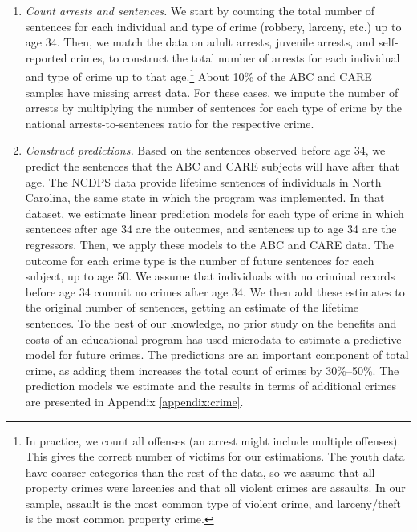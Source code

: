 \begin{enumerate}
\item \textit{Count arrests and sentences.} We start by counting the total number of sentences for each individual
and type of crime (robbery, larceny, etc.) up to age 34. Then, we match the data on adult arrests, juvenile arrests, and self-reported crimes, to construct the total number of  arrests for each individual and type of crime up to that age.\footnote{In practice, we count all offenses (an arrest might include multiple offenses). This gives the correct number of victims for our estimations. The youth data have coarser categories than the rest of the data, so we assume that all property crimes were larcenies and that all violent crimes are assaults. In our sample, assault is the most common type of violent crime, and larceny/theft is the most common property crime.} About 10\% of the ABC and CARE samples have missing arrest data. For these cases, we impute the number of arrests by multiplying the number of sentences for each type of crime by the  national arrests-to-sentences ratio for the respective crime.

\item \textit{Construct predictions.} Based on the sentences observed before age 34, we predict the sentences
that the ABC and CARE subjects will have after that age. The NCDPS data provide lifetime sentences of individuals in North Carolina, the same state in which the program was implemented. In that dataset, we estimate linear prediction models for each type of crime in which sentences after age 34 are the outcomes, and sentences up to age 34 are the regressors. Then, we apply these models to the ABC and CARE data. The outcome for each crime type is the number of future sentences for each subject, up to age 50. We assume that individuals with no criminal records before age 34 commit no crimes after age 34. We then add these estimates to the original number of sentences, getting an estimate of the lifetime sentences. To the best of our knowledge, no prior study on the benefits and costs of an educational program has used microdata to estimate a predictive model for future crimes. The predictions are an important component of total crime, as adding them increases the total count of crimes by 30\%--50\%. The prediction models we estimate and the results in terms of additional crimes are presented in Appendix \ref{appendix:crime}.


\end{enumerate}
